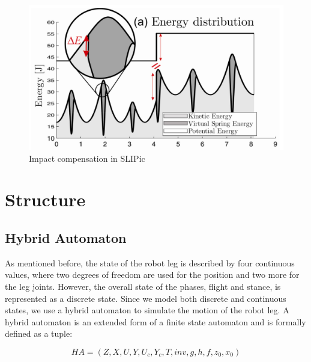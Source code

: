\documentclass[10pt,conference]{IEEEtran}
\begin{document}
\begin{figure}[h]
   \centering
   \includegraphics[scale=0.15]{"assets/SLIPic.png"}
   \caption{Impact compensation in SLIPic \cite{Hutter2010}}
   \label{fig:SLIPic}
\end{figure}

\section{Structure}
\label{sec:Structure}
\subsection{Hybrid Automaton}

As mentioned before, the state of the robot leg is described by four continuous values, where two degrees of freedom are used for the position and two more for the leg joints. However, the overall state of the phases, flight and stance, is represented as a discrete state. Since we model both discrete and continuous states, we use a hybrid automaton to simulate the motion of the robot leg. A hybrid automaton is an extended form of a finite state automaton and is formally defined as a tuple:

$$ HA = (Z, X, U, Y, U_c, Y_c, T, inv, g, h, f, z_0, x_0) $$ 
\end{document}
